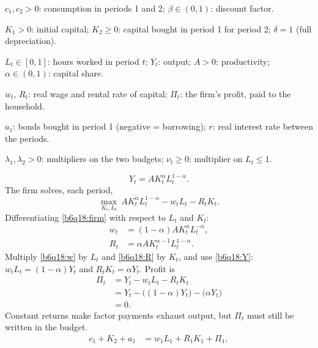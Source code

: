 \begin{sol}
\begin{notacao}
\item $c_1,c_2>0$: consumption in periods 1 and 2; $\beta\in(0,1)$: discount factor.
\item $K_1>0$: initial capital; $K_2\ge0$: capital bought in period 1 for period 2; $\delta=1$ (full depreciation).
\item $L_t\in[0,1]$: hours worked in period $t$; $Y_t$: output; $A>0$: productivity; $\alpha\in(0,1)$: capital share.
\item $w_t$, $R_t$: real wage and rental rate of capital; $\Pi_t$: the firm's profit, paid to the household.
\item $a_1$: bonds bought in period 1 (negative = borrowing); $r$: real interest rate between the periods.
\item $\lambda_1,\lambda_2>0$: multipliers on the two budgets; $\nu_t\ge0$: multiplier on $L_t\le1$.
\end{notacao}
\begin{equation}
Y_t=AK_t^{\alpha}L_t^{1-\alpha}. \label{b6q18:Y}
\end{equation}
The firm solves, each period,
\begin{equation}
\max_{K_t,L_t}\ AK_t^\alpha L_t^{1-\alpha}-w_tL_t-R_tK_t. \label{b6q18:firm}
\end{equation}
Differentiating \eqref{b6q18:firm} with respect to $L_t$ and $K_t$:
\begin{align}
w_t&=(1-\alpha)AK_t^\alpha L_t^{-\alpha}, \label{b6q18:w}\\
R_t&=\alpha AK_t^{\alpha-1}L_t^{1-\alpha}. \label{b6q18:R}
\end{align}
Multiply \eqref{b6q18:w} by $L_t$ and \eqref{b6q18:R} by $K_t$, and use \eqref{b6q18:Y}: $w_tL_t=(1-\alpha)Y_t$ and $R_tK_t=\alpha Y_t$. Profit is
\begin{align}
\Pi_t&=Y_t-w_tL_t-R_tK_t\nonumber\\
&=Y_t-\big((1-\alpha)Y_t\big)-\big(\alpha Y_t\big)\nonumber\\
&=0. \label{b6q18:Pi}
\end{align}
Constant returns make factor payments exhaust output, but $\Pi_t$ must still be written in the budget.
\begin{align}
c_1+K_2+a_1&=w_1L_1+R_1K_1+\Pi_1, \label{b6q18:bc1}\\

\end{align}
\end{sol}
